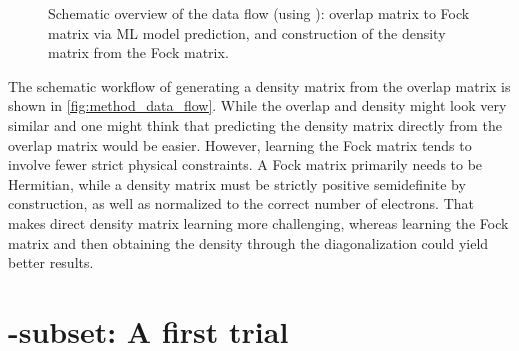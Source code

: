 \begin{figure}[H]
    \caption[Schematic overview data flow]{Schematic overview of the data flow (using ): overlap matrix to Fock matrix via ML model prediction, and construction of the density matrix from the Fock matrix.}
    \label{fig:method_data_flow}
\end{figure}

The schematic workflow of generating a density matrix from the overlap matrix is shown in \autoref{fig:method_data_flow}. While the overlap and density might look very similar and one might think that predicting the density matrix directly from the overlap matrix would be easier. However, learning the Fock matrix tends to involve fewer strict physical constraints. A Fock matrix primarily needs to be Hermitian, while a density matrix must be strictly positive semidefinite by construction, as well as normalized to the correct number of electrons. That makes direct density matrix learning more challenging, whereas learning the Fock matrix and then obtaining the density through the diagonalization could yield better results. 

\section{-subset: A first trial}
\label{sec:qm9_c5h4n2o2}

